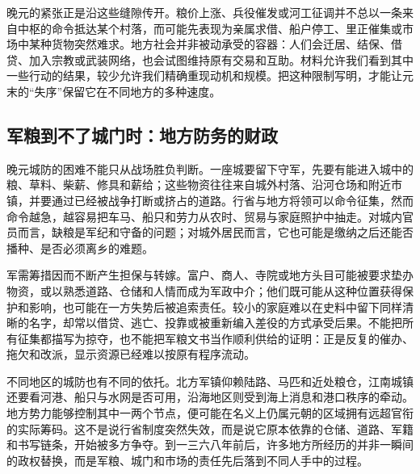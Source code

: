 晚元的紧张正是沿这些缝隙传开。粮价上涨、兵役催发或河工征调并不总以一条来自中枢的命令抵达某个村落，而可能先表现为亲属求借、船户停工、里正催集或市场中某种货物突然难求。地方社会并非被动承受的容器：人们会迁居、结保、借贷、加入宗教或武装网络，也会试图维持原有交易和互助。材料允许我们看到其中一些行动的结果，较少允许我们精确重现动机和规模。把这种限制写明，才能让元末的“失序”保留它在不同地方的多种速度。

\subsection{军粮到不了城门时：地方防务的财政}

晚元城防的困难不能只从战场胜负判断。一座城要留下守军，先要有能进入城中的粮、草料、柴薪、修具和薪给；这些物资往往来自城外村落、沿河仓场和附近市镇，并要通过已经被战争打断或挤占的道路。行省与地方将领可以命令征集，然而命令越急，越容易把车马、船只和劳力从农时、贸易与家庭照护中抽走。对城内官员而言，缺粮是军纪和守备的问题；对城外居民而言，它也可能是缴纳之后还能否播种、是否必须离乡的难题。

军需筹措因而不断产生担保与转嫁。富户、商人、寺院或地方头目可能被要求垫办物资，或以熟悉道路、仓储和人情而成为军政中介；他们既可能从这种位置获得保护和影响，也可能在一方失势后被追索责任。较小的家庭难以在史料中留下同样清晰的名字，却常以借贷、逃亡、投靠或被重新编入差役的方式承受后果。不能把所有征集都描写为掠夺，也不能把军粮文书当作顺利供给的证明：正是反复的催办、拖欠和改派，显示资源已经难以按原有程序流动。

不同地区的城防也有不同的依托。北方军镇仰赖陆路、马匹和近处粮仓，江南城镇还要看河港、船只与水网是否可用，沿海地区则受到海上消息和港口秩序的牵动。地方势力能够控制其中一两个节点，便可能在名义上仍属元朝的区域拥有远超官衔的实际筹码。这不是说行省制度突然失效，而是说它原本依靠的仓储、道路、军籍和书写链条，开始被多方争夺。到一三六八年前后，许多地方所经历的并非一瞬间的政权替换，而是军粮、城门和市场的责任先后落到不同人手中的过程。
